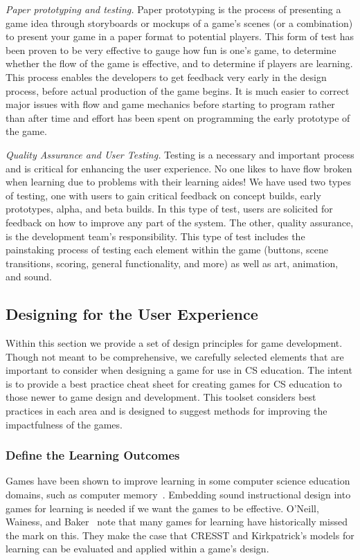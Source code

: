 \documentclass{sig-alternate-05-2015}
\begin{document}
{\em Paper prototyping and testing.} Paper prototyping is the process of presenting a game idea through storyboards or mockups of a game's scenes (or a combination) to present your game in a paper format to potential players. This form of test has been proven to be very effective to gauge how fun is one's game, to determine whether the flow of the game is effective, and to determine if players are learning. This process enables the developers to get feedback very early in the design process, before actual production of the game begins. It is much easier to correct major issues with flow and game mechanics before starting to program rather than after time and effort has been spent on programming the early prototype of the game.



{\em Quality Assurance and User Testing.} Testing is a necessary and important process and is critical for enhancing the user experience. No one likes to have flow broken when learning due to problems with their learning aides! We have used two types of testing, one with users to gain critical feedback on concept builds, early prototypes, alpha, and beta builds. In this type of test, users are solicited for feedback on how to improve any part of the system. The other, quality assurance, is the development team's responsibility. This type of test includes the painstaking process of testing each element within the game (buttons, scene transitions, scoring, general functionality, and more) as well as art, animation, and sound. \subsection{Designing for the User Experience}


Within this section we provide a set of design principles for game development. Though not meant to be comprehensive, we carefully selected elements that are important to consider when designing a game for use in CS education. The intent is to provide a best practice cheat sheet for creating games for CS education to those newer to game design and development. This toolset considers best practices in each area and is designed to suggest methods for improving the impactfulness of the games.\subsubsection{Define the Learning Outcomes}


Games have been shown to improve learning in some computer science education domains, such as computer memory~\cite{papastergiou2009digital}. Embedding sound instructional design into games for learning is needed if we want the games to be effective. O'Neill, Wainess, and Baker~\cite{oneil05classification} note that many games for learning have historically missed the mark on this. They make the case that CRESST and Kirkpatrick's models for learning can be evaluated and applied within a game's design. 
\end{document}

